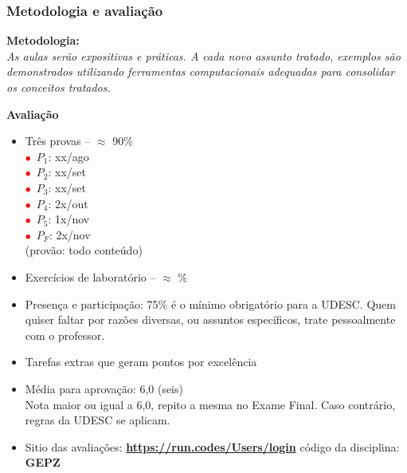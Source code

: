 \begin{frame}[allowframebreaks=0.9]

\frametitle{Metodologia e avaliação}

\textbf{Metodologia:} \\

\textit{As aulas serão expositivas e práticas. A cada novo assunto tratado,
 exemplos  são demonstrados utilizando ferramentas computacionais adequadas
  para consolidar os conceitos 
 tratados. 
 }


\newpage
    \textbf{Avaliação}

    \begin{itemize}
    \item Três provas -- $\approx$  90\%\\
      
	\quad \textcolor{red}{$\bullet$}~$P_1$: xx/ago\\
	\quad \textcolor{red}{$\bullet$}~$P_2$: xx/set\\
		\quad \textcolor{red}{$\bullet$}~$P_3$: xx/set\\
	\quad \textcolor{red}{$\bullet$}~$P_4$: 2x/out\\
		\quad \textcolor{red}{$\bullet$}~$P_5$: 1x/nov\\
	\quad \textcolor{red}{$\bullet$}~$P_F$: 2x/nov\\(provão: todo conteúdo)

      \item Exercícios de laboratório  -- $\approx$ \%
       
      \item Presença e participação: 75\% é o mínimo obrigatório
      para a UDESC. Quem quiser faltar por razões diversas,
       ou assuntos específicos, trate pessoalmente com o professor.
        
      \item Tarefas extras que geram pontos por excelência 
      
      \item Média para aprovação: 6,0 (seis)\\
      Nota maior ou igual a 6,0, repito a mesma no Exame Final. 
      Caso contrário, regras da UDESC se aplicam.
      
      
      \item Sitio das avaliações: \textbf{\url{https://run.codes/Users/login}} 
      código da disciplina: \textbf{GEPZ}
      
    \end{itemize}

\end{frame}



